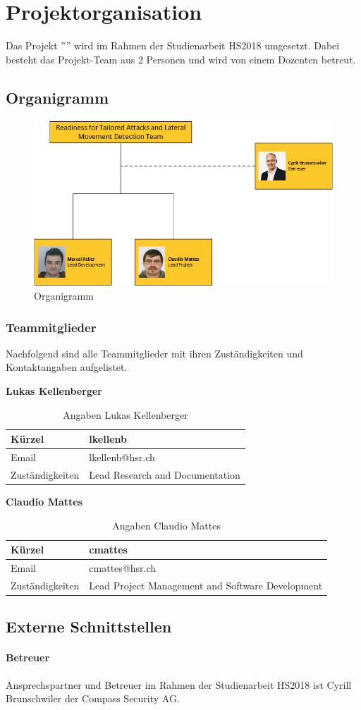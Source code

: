 \section{Projektorganisation}
Das Projekt ''\TITLE'' wird im Rahmen der Studienarbeit HS2018 umgesetzt. Dabei besteht das Projekt-Team aus 2 Personen und wird von einem Dozenten betreut.

\subsection{Organigramm}
\begin{figure}[H]
    \centering
    \includegraphics[width=0.7\linewidth]{assets/organigramm.png}
    \caption{Organigramm}
\end{figure}

\subsubsection{Teammitglieder}
Nachfolgend sind alle Teammitglieder mit ihren Zuständigkeiten und Kontaktangaben aufgelistet.

\vspace{5mm}
\textbf{Lukas Kellenberger}

\begin{table}[H]
    \centering
    \begin{tabular}{p{4cm} p{8cm}} \hline
        Kürzel & lkellenb  \\ \hline
        Email & lkellenb@hsr.ch  \\ \hline
        Zuständigkeiten & Lead Research and Documentation \\ \hline
    \end{tabular}
    \caption{Angaben Lukas Kellenberger}
\end{table}

\textbf{Claudio Mattes}

\begin{table}[H]
    \centering
    \begin{tabular}{p{4cm} p{8cm}} \hline
        Kürzel & cmattes  \\ \hline
        Email & cmattes@hsr.ch  \\ \hline
        Zuständigkeiten & Lead Project Management and Software Development \\ \hline
    \end{tabular}
    \caption{Angaben Claudio Mattes}
\end{table}

\subsection{Externe Schnittstellen}

\paragraph{Betreuer} Ansprechspartner und Betreuer im Rahmen der Studienarbeit HS2018 ist Cyrill Brunschwiler der Compass Security AG.